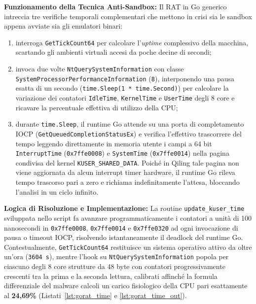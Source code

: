 \documentclass[11pt, a4paper]{article}
\begin{document}
\textbf{Funzionamento della Tecnica Anti-Sandbox:} Il RAT in Go generico intreccia tre verifiche temporali complementari che mettono in crisi sia le sandbox appena avviate sia gli emulatori binari:
\begin{enumerate}
	\item interroga \texttt{Get\allowbreak{}Tick\allowbreak{}Count64} per calcolare l'\textit{uptime} complessivo della macchina, scartando gli ambienti virtuali accesi da poche decine di secondi;
	\item invoca due volte \texttt{Nt\allowbreak{}Query\allowbreak{}System\allowbreak{}Information} con classe \texttt{System\allowbreak{}Processor\allowbreak{}Performance\allowbreak{}Information} (\texttt{8}), interponendo una pausa esatta di un secondo (\texttt{time.\allowbreak{}Sleep(1 * time.\allowbreak{}Second)}) per calcolare la variazione dei contatori \texttt{IdleTime}, \texttt{KernelTime} e \texttt{UserTime} degli 8 core e ricavare la percentuale effettiva di utilizzo della CPU;
	\item durante \texttt{time.Sleep}, il runtime Go attende su una porta di completamento IOCP (\texttt{Get\allowbreak{}Queued\allowbreak{}Completion\allowbreak{}Status\allowbreak{}Ex}) e verifica l'effettivo trascorrere del tempo leggendo direttamente in memoria utente i campi a 64 bit \texttt{Interrupt\allowbreak{}Time} (\texttt{0x7ffe0008}) e \texttt{SystemTime} (\texttt{0x7ffe0014}) nella pagina condivisa del kernel \texttt{KUSER\_\allowbreak{}SHARED\_\allowbreak{}DATA}. Poich\'e in Qiling tale pagina non viene aggiornata da alcun interrupt timer hardware, il runtime Go rileva tempo trascorso pari a zero e richiama indefinitamente l'attesa, bloccando l'analisi in un ciclo infinito.
\end{enumerate}

\textbf{Logica di Risoluzione e Implementazione:} La routine \texttt{update\_\allowbreak{}kuser\_\allowbreak{}time} sviluppata nello script fa avanzare programmaticamente i contatori a unit\`a di 100 nanosecondi in \texttt{0x7ffe0008}, \texttt{0x7ffe0014} e \texttt{0x7ffe0320} ad ogni invocazione di pausa o timeout IOCP, risolvendo istantaneamente il deadlock del runtime Go. Contestualmente, \texttt{Get\allowbreak{}Tick\allowbreak{}Count64} restituisce un sistema operativo attivo da oltre un'ora (\texttt{3604 s}), mentre l'hook su \texttt{Nt\allowbreak{}Query\allowbreak{}System\allowbreak{}Information} popola per ciascuno degli 8 core strutture da 48 byte con contatori progressivamente crescenti tra la prima e la seconda lettura, calibrati affinch\'e la formula differenziale del malware calcoli un carico fisiologico della CPU pari esattamente al \textbf{24,69\%} (Listati~\ref{lst:gorat_time} e \ref{lst:gorat_time_out}).
\end{document}
